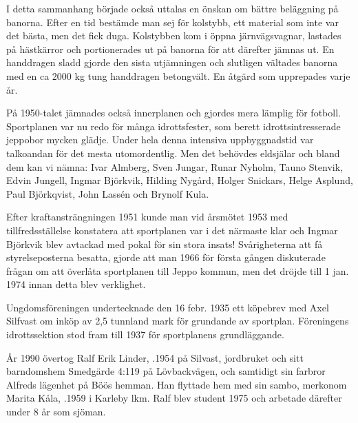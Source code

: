 I detta sammanhang började också uttalas en önskan om bättre beläggning på banorna. Efter en tid bestämde man sej för kolstybb, ett material som inte var det bästa, men det fick duga. Kolstybben kom i öppna järnvägsvagnar, lastades på hästkärror och portionerades ut på banorna för att därefter jämnas ut. En handdragen sladd gjorde den sista utjämningen och slutligen vältades banorna med en ca 2000 kg tung handdragen betongvält. En åtgärd som upprepades varje år.

På 1950-talet jämnades också innerplanen och gjordes mera lämplig för fotboll. Sportplanen var nu redo för många idrottsfester, som berett idrottsintresserade jeppobor mycken glädje. Under hela denna intensiva uppbyggnadstid var talkoandan för det mesta utomordentlig. Men det behövdes eldsjälar och bland dem kan vi nämna: Ivar Almberg, Sven Jungar, Runar Nyholm, Tauno Stenvik, Edvin Jungell, Ingmar Björkvik, Hilding Nygård, Holger Snickars, Helge Asplund, Paul Björkqvist, John Lassén och Brynolf Kula.

Efter kraftansträngningen 1951 kunde man vid årsmötet 1953 med tillfredsställelse konstatera att sportplanen var i det närmaste klar och Ingmar Björkvik blev avtackad med pokal för sin stora insats! Svårigheterna att få styrelseposterna besatta, gjorde att man 1966 för första gången diskuterade frågan om att överlåta sportplanen till Jeppo kommun, men det dröjde till 1 jan. 1974 innan detta blev verklighet.


Ungdomsföreningen undertecknade den 16 febr. 1935 ett köpebrev med Axel Silfvast om inköp av 2,5 tunnland mark för grundande av sportplan. Föreningens idrottssektion stod fram till 1937 för sportplanens grundläggande.






År 1990 övertog Ralf Erik Linder, .1954 på Silvast, jordbruket och sitt barndomshem Smedgärde 4:119 på Lövbackvägen, och samtidigt sin farbror Alfreds lägenhet på Böös hemman. Han flyttade hem med sin sambo, merkonom Marita Kåla, .1959 i Karleby lkm. Ralf blev student 1975 och arbetade därefter under 8 år som sjöman.

